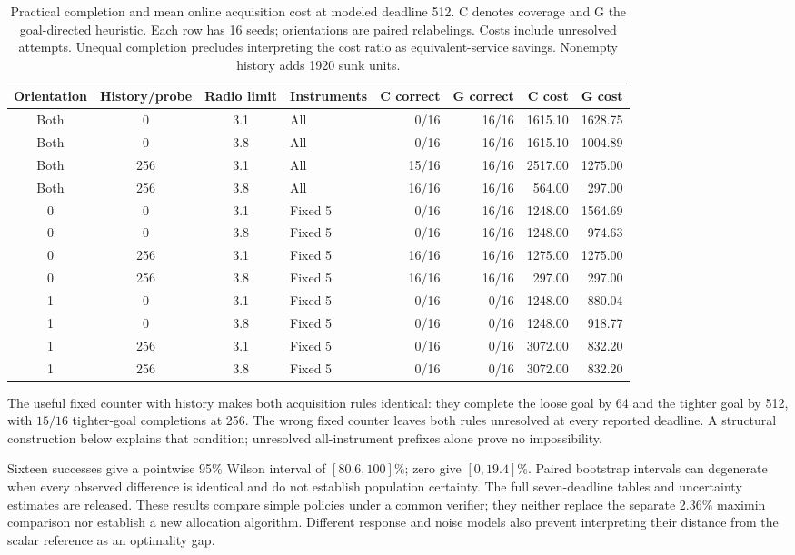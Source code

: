 \begin{table}[t]
\centering
\caption{Practical completion and mean online acquisition cost at modeled
deadline 512. C denotes coverage and G the goal-directed heuristic.
Each row has 16 seeds; orientations are paired relabelings. Costs include
unresolved attempts. Unequal completion precludes interpreting the cost
ratio as equivalent-service savings. Nonempty history adds 1920 sunk units.}
\label{tab:v42-practical}
\small
\begin{tabular}{@{}ccclrrrr@{}}
\toprule
Orientation & History/probe & Radio limit & Instruments & C correct & G correct & C cost & G cost\\
\midrule
Both & 0 & 3.1 & All & 0/16 & 16/16 & 1615.10 & 1628.75\\
Both & 0 & 3.8 & All & 0/16 & 16/16 & 1615.10 & 1004.89\\
Both & 256 & 3.1 & All & 15/16 & 16/16 & 2517.00 & 1275.00\\
Both & 256 & 3.8 & All & 16/16 & 16/16 & 564.00 & 297.00\\
0 & 0 & 3.1 & Fixed 5 & 0/16 & 16/16 & 1248.00 & 1564.69\\
0 & 0 & 3.8 & Fixed 5 & 0/16 & 16/16 & 1248.00 & 974.63\\
0 & 256 & 3.1 & Fixed 5 & 16/16 & 16/16 & 1275.00 & 1275.00\\
0 & 256 & 3.8 & Fixed 5 & 16/16 & 16/16 & 297.00 & 297.00\\
1 & 0 & 3.1 & Fixed 5 & 0/16 & 0/16 & 1248.00 & 880.04\\
1 & 0 & 3.8 & Fixed 5 & 0/16 & 0/16 & 1248.00 & 918.77\\
1 & 256 & 3.1 & Fixed 5 & 0/16 & 0/16 & 3072.00 & 832.20\\
1 & 256 & 3.8 & Fixed 5 & 0/16 & 0/16 & 3072.00 & 832.20\\
\bottomrule
\end{tabular}
\end{table}

The useful fixed counter with history makes both acquisition rules
identical: they complete the loose goal by 64 and the tighter goal by 512,
with $15/16$ tighter-goal completions at 256. The wrong fixed counter
leaves both rules unresolved at every reported deadline. A structural
construction below explains that condition; unresolved all-instrument
prefixes alone prove no impossibility.

Sixteen successes give a pointwise 95\% Wilson interval of
$[80.6,100]\%$; zero give $[0,19.4]\%$. Paired bootstrap intervals
can degenerate when every observed difference is identical and do not
establish population certainty. The full seven-deadline tables and
uncertainty estimates are released. These results compare simple policies
under a common verifier; they neither replace the separate 2.36\%
maximin comparison nor establish a new allocation algorithm. Different
response and noise models also prevent interpreting their distance from
the scalar reference as an optimality gap.

